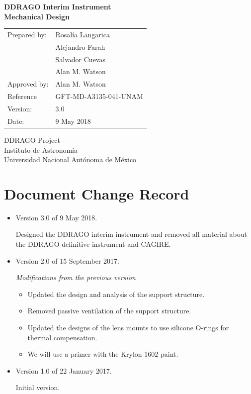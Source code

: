 \documentclass{article}
\begin{document}
\pagestyle{empty}

\begin{center}
\Large \bfseries
DDRAGO Interim Instrument\\Mechanical Design
\end{center}

\vspace{2cm}

\begin{center}

\begin{center}
\begin{tabular}{ll}
Prepared by:&Rosalía Langarica\\
&Alejandro Farah\\
&Salvador Cuevas\\
&Alan M. Watson\\
Approved by:&Alan M. Watson\\
Reference&GFT-MD-A3135-041-UNAM\\
Version:&3.0\\
Date:&9 May 2018\\
\end{tabular}
\end{center}

\vspace{\fill}

DDRAGO Project\\
Instituto de Astronomí­a\\
Universidad Nacional Autónoma de México
\end{center}

\clearpage
\section*{Document Change Record}

\begin{itemize}

\item Version 3.0 of 9 May 2018.

Designed the DDRAGO interim instrument and removed all material about the DDRAGO definitive instrument and CAGIRE.

\item Version 2.0 of 15 September 2017.

{\it Modifications from the previous version}

\begin{itemize}
\item Updated the design and analysis of the support structure.
\item Removed passive ventilation of the support structure.
\item Updated the designs of the lens mounts to use silicone O-rings for thermal compensation.
\item We will use a primer with the Krylon 1602 paint.
\end{itemize}

\item Version 1.0 of 22 January 2017.

Initial version.
\end{itemize}
\end{document}
